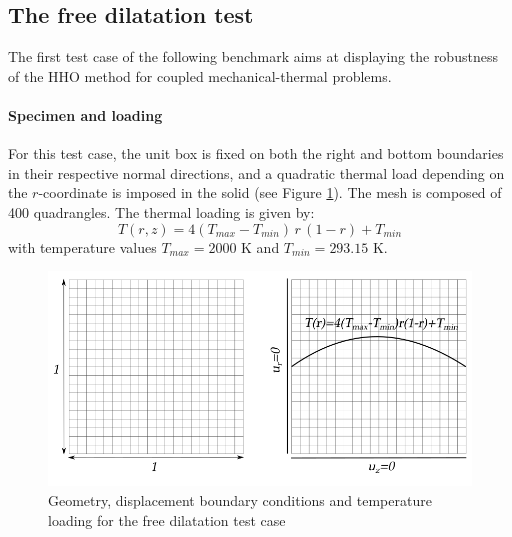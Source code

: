 \subsection{The free dilatation test}
\label{sec_satoh_test}

The first test case of the following benchmark aims at displaying the
robustness of the HHO method for coupled mechanical-thermal problems.

\paragraph{Specimen and loading}

For this test case, the unit box is fixed on both the right and
bottom boundaries in their respective normal directions, and a quadratic
thermal load depending on the $r$-coordinate is imposed in the solid
(see Figure \ref{fig_satoh_setting}). The mesh is composed of 400
quadrangles. The thermal loading is given by:
%
%
%
\begin{equation}
    T(r,z) = 4 (T_{max} - T_{min}) \, r \, (1 - r) + T_{min}
\end{equation}
%
%
%
with temperature values $T_{max} = 2000$ K and $T_{min} = 293.15$ K.

\begin{figure}[H]
    \centering
    \includegraphics[width=10.cm]{../chapter_01_hho_mechanics/figures/satoh_setting.png}
    \caption{Geometry, displacement boundary conditions and temperature loading for the free dilatation test case}
    \label{fig_satoh_setting}
\end{figure}

